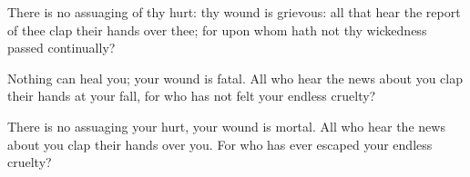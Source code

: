 			\begin{versebox}
					\item[BHS] 
					\item[LXX] 
					\item[ASV] There is no assuaging of thy hurt: thy wound is grievous: all that hear the report of thee clap their hands over thee; for upon whom hath not thy wickedness passed continually?
					\item[NIV] Nothing can heal you; your wound is fatal. All who hear the news about you clap their hands at your fall, for who has not felt your endless cruelty?
					\item[NRSV] There is no assuaging your hurt, your wound is mortal. All who hear the news about you clap their hands over you. For who has ever escaped your endless cruelty?
			\end{versebox}
